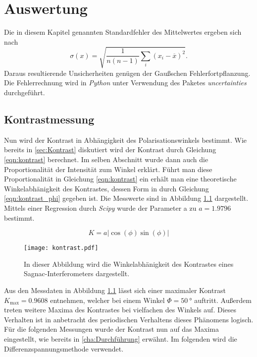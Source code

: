 \chapter{Auswertung}
\label{cha:Auswertung}
Die in diesem Kapitel genannten Standardfehler des Mittelwertes ergeben sich nach
\begin{equation*}
  \label{eqn:MW-Fehler}
  \sigma(x) = \sqrt{\frac{1}{n(n-1)} \sum_i (x_i - \overline{x})^2}.
\end{equation*}
Daraus resultierende Unsicherheiten genügen der Gaußschen Fehlerfortpflanzung.
Die Fehlerrechnung wird in \textit{Python} unter Verwendung des Paketes \textit{uncertainties} \cite{uncertainties} durchgeführt.

\section{Kontrastmessung}
\label{sec:kontrastmessung}
Nun wird der Kontrast in Abhängigkeit des Polarisationswinkels bestimmt. Wie bereits in \autoref{sec:Kontrast} diskutiert wird der Kontrast durch Gleichung \ref{eqn:kontrast} berechnet.
Im selben Abschnitt wurde dann auch die Proportionalität der Intensität zum Winkel erklärt. Führt man diese Proportionalität in Gleichung \ref{eqn:kontrast} ein erhält man eine 
theoretische Winkelabhänigkeit des Kontrastes, dessen Form in durch Gleichung \ref{eqn:kontrast_phi} gegeben ist. Die Messwerte sind in Abbildung \ref{fig:kontrast} dargestellt. Mittels
einer Regression durch \textit{Scipy}\cite{scipy} wurde der Parameter a zu $a = \num{1.9796}$ bestimmt. 

\begin{equation}
  \label{eqn:kontrast_phi}
  K = a\lvert \cos(\phi)\sin(\phi)\rvert  
\end{equation}
\begin{figure}
    \centering
    \texttt{[image: kontrast.pdf]}
    \caption{In dieser Abbildung wird die Winkelabhänigkeit des Kontrastes eines Sagnac-Interferometers dargestellt.}
    \label{fig:kontrast}
\end{figure}

Aus den Messdaten in Abbildung \ref{fig:kontrast} lässt sich einer maximaler Kontrast $K_\mathrm{max} = 0.9608$ entnehmen, welcher bei einem Winkel $\Phi = \qty{50}{\degree}$ auftritt.
Außerdem treten weitere Maxima des Kontrastes bei vielfachen des Winkels auf. Dieses Verhalten ist in anbetracht des periodischen Verhaltens dieses Phänomens logisch. 
Für die folgenden Messungen wurde der Kontrast nun auf das Maxima eingestellt, wie bereits in \autoref{cha:Durchführung} erwähnt. Im folgenden wird die Differenzspannungsmethode 
verwendet.

